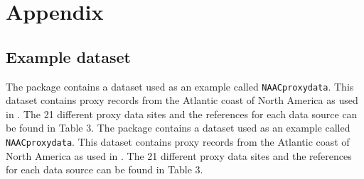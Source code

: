 \section{Appendix}\label{appendix}
\subsection{Example dataset}\label{exampledatasetappendix}
The  package contains a dataset used as an example called \texttt{NAACproxydata}. This dataset contains proxy records from the Atlantic coast of North America as used in \citet{Upton2023noisy}. The 21 different proxy data sites and the references for each data source can be found in Table 3. The  package contains a dataset used as an example called \texttt{NAACproxydata}. This dataset contains proxy records from the Atlantic coast of North America as used in \citet{Upton2023noisy}. The 21 different proxy data sites and the references for each data source can be found in Table 3.
